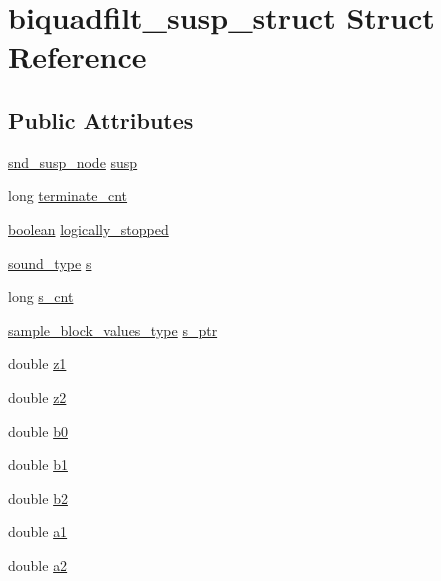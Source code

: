 \hypertarget{structbiquadfilt__susp__struct}{}\section{biquadfilt\+\_\+susp\+\_\+struct Struct Reference}
\label{structbiquadfilt__susp__struct}
\subsection*{Public Attributes}
\begin{DoxyCompactItemize}
\item 
\hyperlink{sound_8h_a6b268203688a934bd798ceb55f85d4c0}{snd\+\_\+susp\+\_\+node} \hyperlink{structbiquadfilt__susp__struct_a5c516e91d78d564759bdb75f71a262d9}{susp}
\item 
long \hyperlink{structbiquadfilt__susp__struct_ae5b5974688ea0dec10f3553f2e6cfdde}{terminate\+\_\+cnt}
\item 
\hyperlink{cext_8h_a7670a4e8a07d9ebb00411948b0bbf86d}{boolean} \hyperlink{structbiquadfilt__susp__struct_acadaa74c0ada5c33f978d6c9f2a1de26}{logically\+\_\+stopped}
\item 
\hyperlink{sound_8h_a792cec4ed9d6d636d342d9365ba265ea}{sound\+\_\+type} \hyperlink{structbiquadfilt__susp__struct_a1882840b888e7b5501ea0cd89bf2af60}{s}
\item 
long \hyperlink{structbiquadfilt__susp__struct_ac622d1876cd7531c58c782c981b85187}{s\+\_\+cnt}
\item 
\hyperlink{sound_8h_a83d17f7b465d1591f27cd28fc5eb8a03}{sample\+\_\+block\+\_\+values\+\_\+type} \hyperlink{structbiquadfilt__susp__struct_adb81fe518b32bb3c4df8652ee10f5001}{s\+\_\+ptr}
\item 
double \hyperlink{structbiquadfilt__susp__struct_a74984c84c74be85a0b7c24c07902a5e7}{z1}
\item 
double \hyperlink{structbiquadfilt__susp__struct_a266bbc5b9e0bf7f1359267cb7d07db25}{z2}
\item 
double \hyperlink{structbiquadfilt__susp__struct_a6eb12d0d781446d149cf2d8b2661e2a1}{b0}
\item 
double \hyperlink{structbiquadfilt__susp__struct_adc255cd522e67c799a84905430ce018f}{b1}
\item 
double \hyperlink{structbiquadfilt__susp__struct_aaba4fa6f052901ead0257308900ae7f4}{b2}
\item 
double \hyperlink{structbiquadfilt__susp__struct_ad902fb8ca9e800e6519c1881d687f27c}{a1}
\item 
double \hyperlink{structbiquadfilt__susp__struct_a3ef2e3a282a31c3667fa117e4c727254}{a2}
\end{DoxyCompactItemize}


